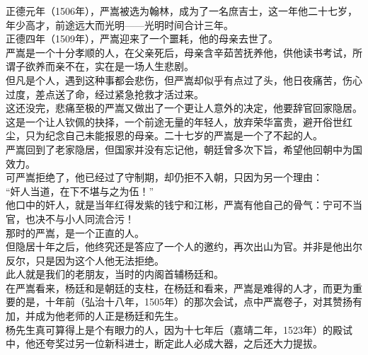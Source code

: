 \begin{multicols}{\theparacolNo}
正德元年（1506年），严嵩被选为翰林，成为了一名庶吉士，这一年他二十七岁，年少高才，前途远大而光明——光明时间合计三年。\\

正德四年（1509年），严嵩迎来了一个噩耗，他的母亲去世了。\\

严嵩是一个十分孝顺的人，在父亲死后，母亲含辛茹苦抚养他，供他读书考试，所谓子欲养而亲不在，实在是一场人生悲剧。\\

但凡是个人，遇到这种事都会悲伤，但严嵩却似乎有点过了头，他日夜痛苦，伤心过度，差点送了命，经过紧急抢救才活过来。\\

这还没完，悲痛至极的严嵩又做出了一个更让人意外的决定，他要辞官回家隐居。\\

这是一个让人钦佩的抉择，一个前途无量的年轻人，放弃荣华富贵，避开俗世红尘，只为纪念自己未能报恩的母亲。二十七岁的严嵩是一个了不起的人。\\

严嵩回到了老家隐居，但国家并没有忘记他，朝廷曾多次下旨，希望他回朝中为国效力。\\

可严嵩拒绝了，他已经过了守制期，却仍拒不入朝，只因为另一个理由：\\

“奸人当道，在下不堪与之为伍！”\\

他口中的奸人，就是当年红得发紫的钱宁和江彬，严嵩有他自己的骨气：宁可不当官，也决不与小人同流合污！\\

那时的严嵩，是一个正直的人。\\

但隐居十年之后，他终究还是答应了一个人的邀约，再次出山为官。并非是他出尔反尔，只是因为这个人他无法拒绝。\\

此人就是我们的老朋友，当时的内阁首辅杨廷和。\\

在严嵩看来，杨廷和是朝廷的支柱，在杨廷和看来，严嵩是难得的人才，而更为重要的是，十年前（弘治十八年，1505年）的那次会试，点中严嵩卷子，对其赞扬有加，并成为他老师的人正是杨廷和先生。\\

杨先生真可算得上是个有眼力的人，因为十七年后（嘉靖二年，1523年）的殿试中，他还夸奖过另一位新科进士，断定此人必成大器，之后还大力提拔。\\


\end{multicols}

